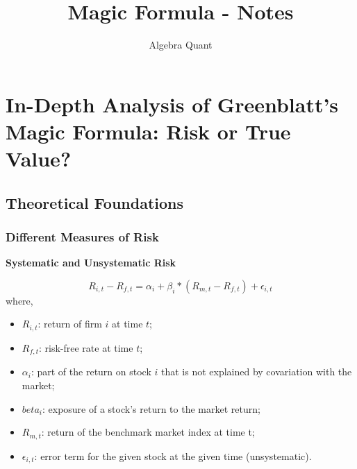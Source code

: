 \documentclass{article}
\title{Magic Formula - Notes}
\author{Algebra Quant}
\begin{document}
  \maketitle

  \section{In-Depth Analysis of Greenblatt's Magic Formula: Risk or True Value?}
  \subsection{Theoretical Foundations}
  \subsubsection{Different Measures of Risk}
  \textbf{Systematic and Unsystematic Risk}

\begin{equation}
  R_{i,t} - R_{f,t} = \alpha_{i} + \beta_{i} * (R_{m,t} - R_{f,t}) + \epsilon_{i,t}
\end{equation}
where,
\begin{itemize}
  \item $R_{i,t}$: return of firm $i$ at time $t$;
  \item $R_{f,t}$: risk-free rate at time $t$;
  \item $\alpha_{i}$: part of the return on stock $i$ that is not explained by covariation with the market;
  \item $beta_{i}$: exposure of a stock's return to the market return;
  \item $R_{m,t}$: return of the benchmark market index at time t;
  \item $\epsilon_{i,t}$: error term for the given stock at the given time (unsystematic).
\end{itemize}
\end{document}
